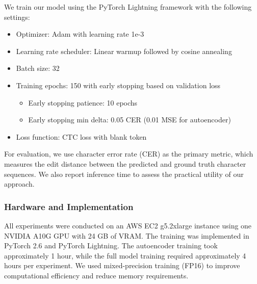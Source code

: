 We train our model using the PyTorch Lightning framework with the following settings:
\begin{itemize}
    \item Optimizer: Adam with learning rate 1e-3
    \item Learning rate scheduler: Linear warmup followed by cosine annealing
    \item Batch size: 32
    \item Training epochs: 150 with early stopping based on validation loss
          \begin{itemize}
              \item Early stopping patience: 10 epochs
              \item Early stopping min delta: 0.05 CER (0.01 MSE for autoencoder)
          \end{itemize}
    \item Loss function: CTC loss with blank token
\end{itemize}

For evaluation, we use character error rate (CER) as the primary metric, which measures the edit distance between the predicted and ground truth character sequences. We also report inference time to assess the practical utility of our approach.

\subsubsection{Hardware and Implementation}\label{subsec:hardware}

All experiments were conducted on an AWS EC2 g5.2xlarge instance using one NVIDIA A10G GPU with 24 GB of VRAM. The training was implemented in PyTorch 2.6 and PyTorch Lightning. The autoencoder training took approximately 1 hour, while the full model training required approximately 4 hours per experiment. We used mixed-precision training (FP16) to improve computational efficiency and reduce memory requirements.
